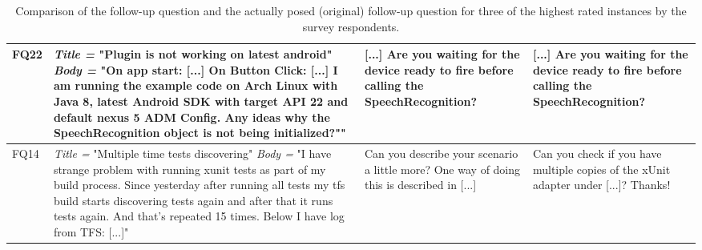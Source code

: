 \begin{table}[t]
	\centering
	\caption{Comparison of the \evpi follow-up question and the actually posed (original) follow-up question for three of the highest rated instances by the survey respondents.}
	\begin{tabular}{ |M{1cm}|p{7.3cm}|p{4cm}|p{4cm}|  }		\hline

		FQ22
		&{\em Title =} "Plugin is not working on latest android" \newline
		{\em Body =} "On app start: [...] \newline
		On Button Click: [...] \newline
		I am running the example code on Arch Linux with Java 8, latest Android SDK with target API 22 and default nexus 5 ADM Config.
		Any ideas why the SpeechRecognition object is not being initialized?""
		& [...] Are you waiting for the device ready to fire before calling the SpeechRecognition?
		& [...] Are you waiting for the device ready to fire before calling the SpeechRecognition?\\ \hline

		FQ14
		&{\em Title =} "Multiple time tests discovering" \newline
		{\em Body =} "I have strange problem with running xunit tests as part of my build process. Since yesterday after running all tests my tfs build starts discovering tests again and after that it runs tests again. And that's repeated 15 times.
		Below I have log from TFS: [...]"
		& Can you describe your scenario a little more? One way of doing this is described in [...]
		& Can you check if you have multiple copies of the xUnit adapter under [...]? Thanks! \\ \hline
	\end{tabular}
\label{tab:survey}
\end{table}


